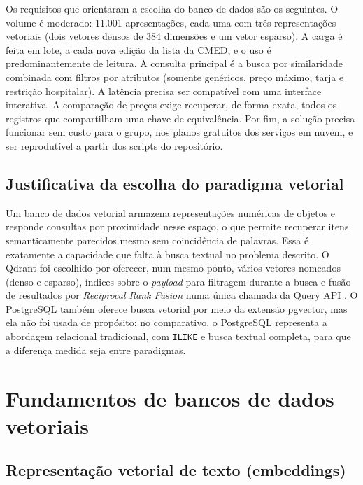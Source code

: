 \documentclass[12pt,oneside,a4paper,english,brazil]{abntex2}
\newcommand{\campo}[1]{\texttt{#1}}
\begin{document}
Os requisitos que orientaram a escolha do banco de dados são os seguintes. O volume é moderado: 11.001 apresentações, cada uma com três representações vetoriais (dois vetores densos de 384 dimensões e um vetor esparso). A carga é feita em lote, a cada nova edição da lista da CMED, e o uso é predominantemente de leitura. A consulta principal é a busca por similaridade combinada com filtros por atributos (somente genéricos, preço máximo, tarja e restrição hospitalar). A latência precisa ser compatível com uma interface interativa. A comparação de preços exige recuperar, de forma exata, todos os registros que compartilham uma chave de equivalência. Por fim, a solução precisa funcionar sem custo para o grupo, nos planos gratuitos dos serviços em nuvem, e ser reprodutível a partir dos scripts do repositório.

\section{Justificativa da escolha do paradigma vetorial}

Um banco de dados vetorial armazena representações numéricas de objetos e responde consultas por proximidade nesse espaço, o que permite recuperar itens semanticamente parecidos mesmo sem coincidência de palavras. Essa é exatamente a capacidade que falta à busca textual no problema descrito. O Qdrant foi escolhido por oferecer, num mesmo ponto, vários vetores nomeados (denso e esparso), índices sobre o \emph{payload} para filtragem durante a busca e fusão de resultados por \emph{Reciprocal Rank Fusion} numa única chamada da Query API \cite{qdrantdocs}. O PostgreSQL também oferece busca vetorial por meio da extensão pgvector, mas ela não foi usada de propósito: no comparativo, o PostgreSQL representa a abordagem relacional tradicional, com \campo{ILIKE} e busca textual completa, para que a diferença medida seja entre paradigmas.

\chapter{Fundamentos de bancos de dados vetoriais}

\section{Representação vetorial de texto (embeddings)}
\end{document}
